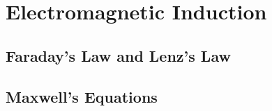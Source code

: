 \chapter{Electromagnetic Induction}

\section{Faraday's Law and Lenz's Law}

\section{Maxwell's Equations}
